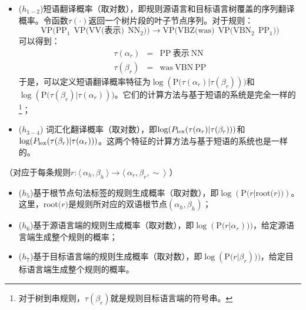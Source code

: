 \begin{itemize}
\vspace{0.5em}
\item ($h_{1-2}$)短语翻译概率（取对数），即规则源语言和目标语言树覆盖的序列翻译概率。令函数$\tau(\cdot)$返回一个树片段的叶子节点序列。对于规则：
\begin{displaymath}
\textrm{VP(}\textrm{PP}_1\ \ \textrm{VP(VV(表示)}\ \ \textrm{NN}_2\textrm{))} \rightarrow \textrm{VP(VBZ(was)}\ \ \textrm{VP(}\textrm{VBN}_2\ \ \textrm{PP}_1\textrm{))}
\end{displaymath}
\noindent 可以得到：
\begin{eqnarray}
\tau( \alpha_r ) & = & \textrm{PP}\ \textrm{表示}\ \textrm{NN} \nonumber \\
\tau( \beta_r ) & = & \textrm{was}\ \textrm{VBN}\ \textrm{PP} \nonumber
\end{eqnarray}
\noindent 于是，可以定义短语翻译概率特征为$\log(\textrm{P(}\tau( \alpha_r )|\tau( \beta_r )))$和$\log(\textrm{P(}\tau( \beta_r )|\tau( \alpha_r )))$。它们的计算方法与基于短语的系统是完全一样的\footnote[9]{对于树到串规则，$\tau( \beta_r )$就是规则目标语言端的符号串。}；
\vspace{0.5em}
\item ($h_{3-4}$) 词汇化翻译概率（取对数），即$\log({P}_{\textrm{lex}}(\tau( \alpha_r )|\tau( \beta_r )))$和$\log({P}_{\textrm{lex}}(\tau( \beta_r )|\tau( \alpha_r )))$。这两个特征的计算方法与基于短语的系统也是一样的。
\vspace{0.5em}
\end{itemize}

\vspace{0.5em}
（对应于每条规则$r : \langle\  \alpha_h, \beta_h\ \rangle \to \langle\ \alpha_r, \beta_r, \sim\ \rangle$ ）

\begin{itemize}
\vspace{0.5em}
\item ($h_{5}$)基于根节点句法标签的规则生成概率（取对数），即$\log(\textrm{P(}r|\textrm{root(}r\textrm{))})$。这里，$\textrm{root(}r)$是规则所对应的双语根节点$(\alpha_h,\beta_h)$；
\vspace{0.5em}
\item ($h_{6}$)基于源语言端的规则生成概率（取对数），即$\log(\textrm{P(}r|\alpha_r)))$，给定源语言端生成整个规则的概率；
\vspace{0.5em}
\item ($h_{7}$)基于目标语言端的规则生成概率（取对数），即$\log(\textrm{P(}r|\beta_r)))$，给定目标语言端生成整个规则的概率。
\end{itemize}

